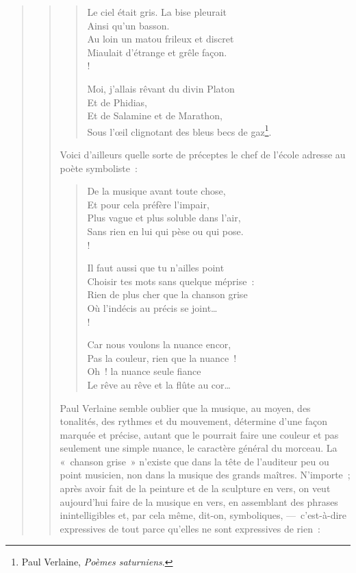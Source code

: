 \documentclass[french,twoside]{book} %
\begin{document}
\begin{verse}
\begin{verse}
\begin{verse}
Le ciel était gris. La bise pleurait\\
Ainsi qu’un basson.\\
Au loin un matou frileux et discret\\
Miaulait d’étrange et grêle façon.\\!

Moi, j’allais rêvant du divin Platon\\
Et de Phidias,\\
Et de Salamine et de Marathon,\\
Sous l’œil clignotant des bleus becs de gaz\footnote{ Paul Verlaine, \emph{Poèmes saturniens}.}.\\
\end{verse}

\noindent Voici d’ailleurs quelle sorte de préceptes le chef de l’école adresse au poète symboliste :\par


\begin{verse}
De la musique avant toute chose,\\
Et pour cela préfère l’impair,\\
Plus vague et plus soluble dans l’air,\\
Sans rien en lui qui pèse ou qui pose.\\!

Il faut aussi que tu n’ailles point\\
Choisir tes mots sans quelque méprise :\\
Rien de plus cher que la chanson grise\\
Où l’indécis au précis se joint…\\!

Car nous voulons la nuance encor,\\
Pas la couleur, rien que la nuance !\\
Oh ! la nuance seule fiance\\
Le rêve au rêve et la flûte au cor…\\
\end{verse}

\noindent Paul Verlaine semble oublier que la musique, au moyen, des tonalités, des rythmes et du mouvement, détermine d’une façon marquée et précise, autant que le pourrait faire une couleur et pas seulement une simple nuance, le caractère général du morceau. La « chanson grise » n’existe que dans la tête de l’auditeur peu ou point musicien, non dans la musique des grands maîtres. N’importe ; après avoir fait de la peinture et de la sculpture en vers, on veut aujourd’hui faire de la musique en vers, en assemblant des phrases inintelligibles et, par cela même, dit-on, symboliques, — c’est-à-dire expressives de tout parce qu’elles ne sont expressives de rien :\par



\end{verse}
\end{verse}
\end{document}

